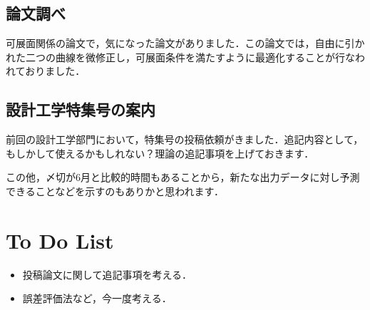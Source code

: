 \documentclass[11pt]{jsarticle}
\begin{document}
		\subsection{論文調べ}
			可展面関係の論文で，気になった論文がありました．この論文では，自由に引かれた二つの曲線を微修正し，可展面条件を満たすように最適化することが行なわれておりました．
		\subsection{設計工学特集号の案内}
			前回の設計工学部門において，特集号の投稿依頼がきました．追記内容として，もしかして使えるかもしれない？理論の追記事項を上げておきます．
			
			
			
			この他，〆切が6月と比較的時間もあることから，新たな出力データに対し予測できることなどを示すのもありかと思われます．
	\section{To Do List}
		\begin{itemize}
			\item 投稿論文に関して追記事項を考える．
			\item 誤差評価法など，今一度考える．
		\end{itemize}
				
	\newpage
\vspace{10cm}
	

\vspace{14cm}
	\articleSPRfour
	\articleSPRfive
\end{document}
